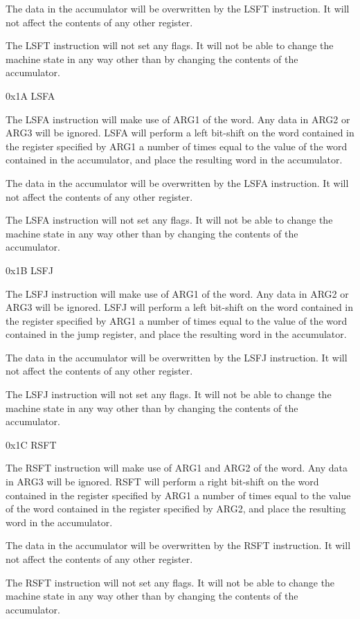 \documentclass[]{article}
\begin{document}
The data in the accumulator will be overwritten by the LSFT instruction.
It will not affect the contents of any other register.

The LSFT instruction will not set any flags. It will not be able to
change the machine state in any way other than by changing the contents
of the accumulator.

0x1A LSFA

The LSFA instruction will make use of ARG1 of the word. Any data in ARG2
or ARG3 will be ignored. LSFA will perform a left bit-shift on the word
contained in the register specified by ARG1 a number of times equal to
the value of the word contained in the accumulator, and place the
resulting word in the accumulator.

The data in the accumulator will be overwritten by the LSFA instruction.
It will not affect the contents of any other register.

The LSFA instruction will not set any flags. It will not be able to
change the machine state in any way other than by changing the contents
of the accumulator.

0x1B LSFJ

The LSFJ instruction will make use of ARG1 of the word. Any data in ARG2
or ARG3 will be ignored. LSFJ will perform a left bit-shift on the word
contained in the register specified by ARG1 a number of times equal to
the value of the word contained in the jump register, and place the
resulting word in the accumulator.

The data in the accumulator will be overwritten by the LSFJ instruction.
It will not affect the contents of any other register.

The LSFJ instruction will not set any flags. It will not be able to
change the machine state in any way other than by changing the contents
of the accumulator.

0x1C RSFT

The RSFT instruction will make use of ARG1 and ARG2 of the word. Any
data in ARG3 will be ignored. RSFT will perform a right bit-shift on the
word contained in the register specified by ARG1 a number of times equal
to the value of the word contained in the register specified by ARG2,
and place the resulting word in the accumulator.

The data in the accumulator will be overwritten by the RSFT instruction.
It will not affect the contents of any other register.

The RSFT instruction will not set any flags. It will not be able to
change the machine state in any way other than by changing the contents
of the accumulator.
\end{document}
